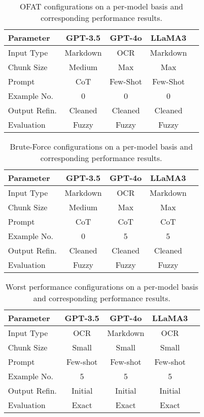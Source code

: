 \begin{table}[h]
\centering
\footnotesize
\caption{OFAT configurations on a per-model basis and corresponding performance results.}
\begin{tabular}{lcccc}
\toprule
\textbf{Parameter} & \textbf{GPT-3.5} & \textbf{GPT-4o} & \textbf{LLaMA3} \\
\midrule
Input Type & Markdown & OCR & Markdown  \\
Chunk Size & Medium & Max & Max \\
Prompt & CoT & Few-Shot & Few-Shot &\\
Example No. & 0 & 0 & 0 \\
Output Refin. & Cleaned & Cleaned & Cleaned \\
Evaluation & Fuzzy & Fuzzy & Fuzzy \\
\bottomrule
\end{tabular}
\label{tab:OFAT_configurations_per_model}
\end{table}

\begin{table}[h]
\centering
\footnotesize
\caption{Brute-Force configurations on a per-model basis and corresponding performance results.}
\begin{tabular}{lcccc}
\toprule
\textbf{Parameter} & \textbf{GPT-3.5} & \textbf{GPT-4o} & \textbf{LLaMA3} \\
\midrule
Input Type & Markdown & OCR & Markdown  \\
Chunk Size & Medium & Max & Max \\
Prompt & CoT & CoT & CoT &\\
Example No. & 0 & 5 & 5 \\
Output Refin. & Cleaned & Cleaned & Cleaned \\
Evaluation & Fuzzy & Fuzzy & Fuzzy \\
\bottomrule
\end{tabular}
\label{tab:Brute_force_configurations_per_model}
\end{table}

\begin{table}[h]
\centering
\footnotesize
\caption{Worst performance configurations on a per-model basis and corresponding performance results.}
\begin{tabular}{lcccc}
\toprule
\textbf{Parameter} & \textbf{GPT-3.5} & \textbf{GPT-4o} & \textbf{LLaMA3} \\
\midrule
Input Type & OCR & Markdown & OCR  \\
Chunk Size & Small & Small & Small \\
Prompt & Few-shot & Few-shot & Few-shot \\
Example No. & 5 & 5 & 5 \\
Output Refin. & Initial & Initial & Initial \\
Evaluation & Exact & Exact & Exact \\
\bottomrule
\end{tabular}
\label{tab:worst_configurations_per_model}
\end{table}

